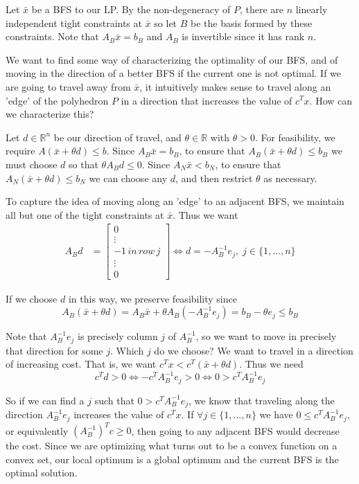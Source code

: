 \documentclass[12pt]{article}
\begin{document}
Let $\bar{x}$ be a BFS to our LP. By the non-degeneracy of $P$, there are $n$ linearly independent tight constraints at $\bar{x}$ so let $B$ be the basis formed by these constraints. Note that $A_B\bar{x} = b_B$ and $A_B$ is invertible since it has rank $n$. 
\medskip

We want to find some way of characterizing the optimality of our BFS, and of moving in the direction of a better BFS if the current one is not optimal. If we are going to travel away from $\bar{x}$, it intuitively makes sense to travel along an 'edge' of the polyhedron $P$ in a direction that increases the value of $c^Tx$. How can we characterize this?
\medskip

Let $d \in \mathbb{R}^n$ be our direction of travel, and $\theta \in \mathbb{R}$ with $\theta > 0$. For feasibility, we require $A(\bar{x} + \theta d) \leq b$. Since $A_B\bar{x} = b_B$, to ensure that $A_B(\bar{x} + \theta d) \leq b_B$ we must choose $d$ so that $\theta A_B d \leq 0$. Since $A_N\bar{x} < b_N$, to ensure that $A_N(\bar{x} + \theta d) \leq b_N$ we can choose any $d$, and then restrict $\theta$ as necessary.
\medskip

To capture the idea of moving along an 'edge' to an adjacent BFS, we maintain all but one of the tight constraints at $\bar{x}$. Thus we want 
\begin{align*}
A_Bd &= \begin{bmatrix}
					0 \\
					\vdots \\
					-1\,in\,row\,j\\ 
					\vdots \\
					0 
					\end{bmatrix}
\iff d = -A_B^{-1}e_j, \; j \in \{1,...,n\}
\end{align*}

If we choose $d$ in this way, we preserve feasibility since
$$A_B(\bar{x} + \theta d) = A_B\bar{x} + \theta A_B(-A_B^{-1}e_j) = b_B - \theta e_j \leq b_B$$

Note that $A_B^{-1}e_j$ is precisely column $j$ of $A_B^{-1}$, so we want to move in precisely that direction for some $j$. Which $j$ do we choose? We want to travel in a direction of increasing cost. That is, we want $c^Tx < c^T(\bar{x} + \theta d)$. Thus we need
$$c^Td > 0 \iff -c^TA_B^{-1}e_j > 0 \iff 0 > c^TA_B^{-1}e_j$$

So if we can find a $j$ such that $0 > c^TA_B^{-1}e_j$, we know that traveling along the direction $A_B^{-1}e_j$ increases the value of $c^Tx$. If $\forall j \in \{1,...,n\}$ we have $0 \leq c^TA_B^{-1}e_j$, or equivalently $(A_B^{-1})^Tc \geq 0$, then going to any adjacent BFS would decrease the cost. Since we are optimizing what turns out to be a convex function on a convex set, our local optimum is a global optimum and the current BFS is the optimal solution.
\medskip
\end{document}
